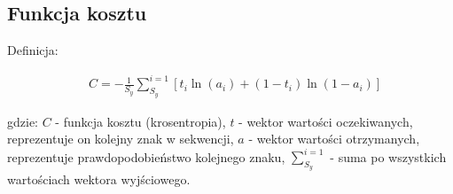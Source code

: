 \subsection{Funkcja kosztu}

Definicja:

\begin{align*}
  &C = - \frac{1}{S_y}\sum_{S_y}^{i=1}[t_i\ln(a_i) + (1-t_i)\ln(1-a_i)]
\end{align*}

gdzie: \newline
$C$ - funkcja kosztu (krosentropia), \newline
$t$ - wektor wartości oczekiwanych, reprezentuje on kolejny znak w sekwencji, \newline
$a$ - wektor wartości otrzymanych, reprezentuje prawdopodobieństwo kolejnego znaku,  \newline
$\sum_{S_y}^{i=1}$ - suma po wszystkich wartościach wektora wyjściowego. \newline